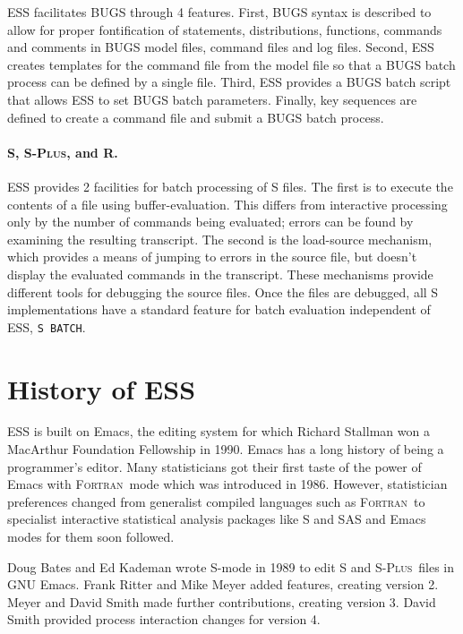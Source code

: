 \documentclass{article}
\newcommand*{\Splus}{\textsc{S-Plus}}
\newcommand*{\Fortran}{\textsc{Fortran}}
\newcommand{\stexttt}[1]{{\small\texttt{#1}}}
\begin{document}
ESS facilitates BUGS %
through 4 features.
First, BUGS syntax is described to allow for proper fontification
of statements, distributions, functions, commands and comments in BUGS
model files, command files and log files.  Second, ESS creates
templates for the command file from the model file so that a BUGS
batch process can be defined by a single file.  Third, ESS provides
a BUGS batch script that allows ESS to set BUGS batch parameters.
Finally, key sequences are defined to create a command file and submit 
a BUGS batch process.

\paragraph{S, \Splus, and R.}
ESS provides 2 facilities for batch processing of S files.  The first
is to execute the contents of a file using buffer-evaluation.  This
differs from interactive processing only by the number of commands
being evaluated; errors can be found by examining the resulting
transcript.  The second is the load-source mechanism, which provides a
means of jumping to errors in the source file, but doesn't display the
evaluated commands in the transcript.  These mechanisms provide
different tools for debugging the source files.  Once the files are
debugged, all S implementations have a standard feature for batch
evaluation independent of ESS, \stexttt{S BATCH}.

\section{History of ESS}
\label{sec:ESS:history}

ESS is built on Emacs, the editing system for which Richard Stallman 
won a MacArthur Foundation Fellowship in 1990.  Emacs has a long history 
of being a programmer's editor.  Many statisticians got their first taste 
of the power of Emacs with \Fortran\ mode which was introduced in 1986.  
However, statistician preferences changed from generalist compiled 
languages such as \Fortran\ to specialist interactive statistical analysis 
packages like S and SAS and Emacs modes for them soon followed.

Doug Bates and Ed Kademan wrote S-mode in 1989 to edit S and \Splus\ files 
in GNU Emacs.  Frank Ritter and Mike Meyer added features, creating version 2.
Meyer and David Smith made further contributions, creating version 3.  David 
Smith provided process interaction changes for version 4.
\end{document}
